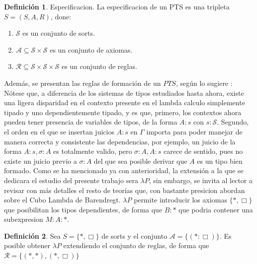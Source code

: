 \documentclass[a4paper,12pt]{report}
\theoremstyle{definition}
\newtheorem{definition}{Definici\'on}[chapter]
\theoremstyle{plain}
\theoremstyle{remark}
\begin{document}
    \begin{definition} Especificacion. La especificacion de un PTS es una tripleta $S = (S, A , R)$, done:
      \begin{enumerate}
        \item $\mathcal{S}$ es un conjunto de sorts.
        \item $\mathcal{A} \subseteq \mathcal{S} \times \mathcal{S}$ es un conjunto de axiomas.
        \item $\mathcal{R} \subseteq \mathcal{S} \times \mathcal{S}\times \mathcal{S}$ es un conjunto de reglas.
      \end{enumerate}
    \end{definition}

    Además, se presentan las reglas de formación de un $PTS$, según lo sugiere \cite{barthe-coquand}:
    \newline
    \newline
    Nótese que, a diferencia de los sistemas de tipos estudiados hasta ahora, existe una ligera disparidad en el contexto presente en el lambda calculo simplemente tipado y uno dependientemente tipado, y es que, primero, los contextos ahora pueden tener presencia de variables de tipos, de la forma $A : s$ con $s : \mathcal{S}$. Segundo, el orden en el que se insertan juicios $A : s$ en $\Gamma$ importa para poder manejar de manera correcta y consistente las dependencias, por ejemplo, un juicio de la forma $A : s, \sigma : A$ es totalmente valido, pero $\sigma : A, A : s$ carece de sentido, pues no existe un juicio previo a $\sigma : A$ del que sea posible derivar que $A$ es un tipo bien formado.
    \newline
    \newline
    \indent Como se ha mencionado ya con anterioridad, la extensión a la que se dedicara el estudio del presente trabajo sera $\lambda P$, sin embargo, se invita al lector a revisar con más detalles el resto de teorías que, con bastante presicion \cite{barthe-coquand} abordan sobre el Cubo Lambda de Barendregt.
\newline
\newline
    \indent $\lambda P$ permite introducir los axiomas $\{*, \Box\}$ que posibilitan los tipos dependientes, de forma que $B : *$ que podria contener una subexpresion $M : A : *$.

    \begin{definition}\label{def:lambdaP}
      Sea $S =\{*, \Box\}$ de sorts y el conjunto $\mathcal{A} =\{(* : \Box)\}$. Es posible obtener $\lambda P$ extendiendo el conjunto de reglas, de forma que $\mathcal{R} = \{(*, *), (*, \Box)\}$
    \end{definition}
\end{document}
